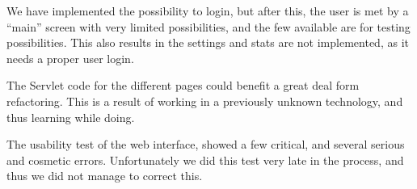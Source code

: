 We have implemented the possibility to login, but after this, the user is met by a ``main'' screen with very limited possibilities, and the few available are for testing possibilities. This also results in the settings and stats are not implemented, as it needs a proper user login.

The Servlet code for the different pages could benefit a great deal form refactoring. This is a result of working in a previously unknown technology, and thus learning while doing.

The usability test of the web interface, showed a few critical, and several serious and cosmetic errors. Unfortunately we did this test very late in the process, and thus we did not manage to correct this.
	

